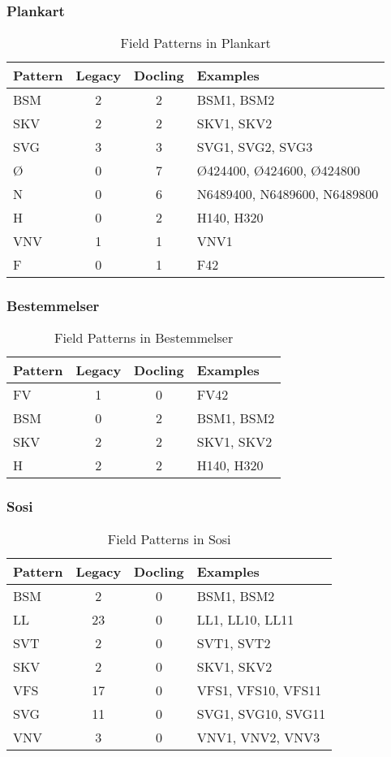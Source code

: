 \subsubsection{Plankart}

\begin{table}[h]
\centering
\begin{tabular}{l|cc|l}
\hline
Pattern & Legacy & Docling & Examples \\
\hline
BSM & 2 & 2 & BSM1, BSM2 \\
SKV & 2 & 2 & SKV1, SKV2 \\
SVG & 3 & 3 & SVG1, SVG2, SVG3 \\
Ø & 0 & 7 & Ø424400, Ø424600, Ø424800 \\
N & 0 & 6 & N6489400, N6489600, N6489800 \\
H & 0 & 2 & H140, H320 \\
VNV & 1 & 1 & VNV1 \\
F & 0 & 1 & F42 \\
\hline
\end{tabular}
\caption{Field Patterns in Plankart}
\end{table}

\subsubsection{Bestemmelser}

\begin{table}[h]
\centering
\begin{tabular}{l|cc|l}
\hline
Pattern & Legacy & Docling & Examples \\
\hline
FV & 1 & 0 & FV42 \\
BSM & 0 & 2 & BSM1, BSM2 \\
SKV & 2 & 2 & SKV1, SKV2 \\
H & 2 & 2 & H140, H320 \\
\hline
\end{tabular}
\caption{Field Patterns in Bestemmelser}
\end{table}

\subsubsection{Sosi}

\begin{table}[h]
\centering
\begin{tabular}{l|cc|l}
\hline
Pattern & Legacy & Docling & Examples \\
\hline
BSM & 2 & 0 & BSM1, BSM2 \\
LL & 23 & 0 & LL1, LL10, LL11 \\
SVT & 2 & 0 & SVT1, SVT2 \\
SKV & 2 & 0 & SKV1, SKV2 \\
VFS & 17 & 0 & VFS1, VFS10, VFS11 \\
SVG & 11 & 0 & SVG1, SVG10, SVG11 \\
VNV & 3 & 0 & VNV1, VNV2, VNV3 \\
\hline
\end{tabular}
\caption{Field Patterns in Sosi}
\end{table}

